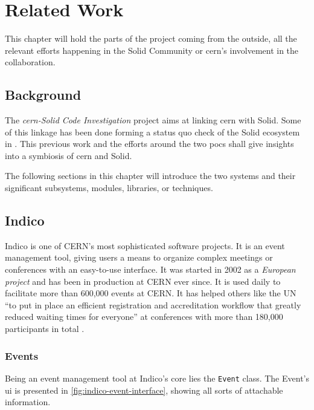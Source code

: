 \chapter{Related Work}

This chapter will hold the parts of the project coming from the outside, all the relevant efforts happening in the Solid Community or \gls{cern}'s involvement in the collaboration.

\section{Background}

The \textit{\gls{cern}-Solid Code Investigation} project aims at linking \gls{cern} with Solid. Some of this linkage has been done forming a status quo check of the Solid ecosystem in \cite{cern-solid-investigation-spec}. This previous work and the efforts around the two \glspl{poc} shall give insights into a symbiosis of \gls{cern} and Solid.

The following sections in this chapter will introduce the two systems and their significant subsystems, modules, libraries, or techniques. 

\section{Indico}

Indico is one of CERN’s most sophisticated software projects. It is an event management tool, giving users a means to organize complex meetings or conferences with an easy-to-use interface. It was started in 2002 as a \textit{European project} and has been in production at CERN ever since. It is used daily to facilitate more than 600,000 events at CERN. It has helped others like the UN “to put in place an efficient registration and accreditation workflow that greatly reduced waiting times for everyone” at conferences with more than 180,000 participants in total \cite{cern-solid-investigation-spec}.

\subsection{Events}

Being an event management tool at Indico's core lies the \texttt{Event} class. The Event's \gls{ui} is presented in \ref{fig:indico-event-interface}, showing all sorts of attachable information. 

